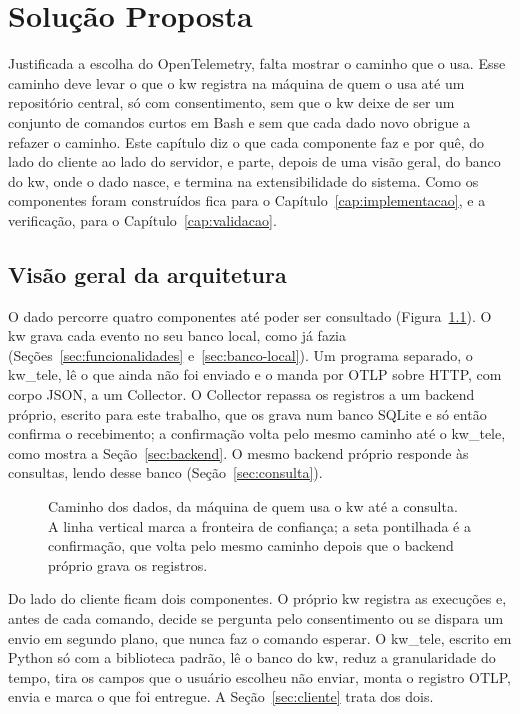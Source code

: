 
\chapter{Solução Proposta}

\label{cap:solucao}

Justificada a escolha do OpenTelemetry, falta mostrar o caminho que o usa. Esse caminho deve
levar o que o kw
registra na máquina de quem o usa até um repositório central, só com
consentimento, sem que o kw deixe de ser um conjunto de comandos curtos em
Bash e sem que cada dado novo obrigue a refazer o caminho. Este capítulo diz o
que cada componente faz e por quê, do lado do cliente ao lado do servidor, e
parte, depois de uma visão geral, do banco do kw, onde o dado nasce, e termina
na extensibilidade do sistema. Como os componentes foram construídos fica para o Capítulo~\ref{cap:implementacao}, e a
verificação, para o Capítulo~\ref{cap:validacao}.

\section{Visão geral da arquitetura}
\label{sec:arquitetura}

O dado percorre quatro componentes até poder ser consultado
(Figura~\ref{fig:arquitetura-caminho}). O kw grava cada evento no seu banco
local, como já fazia (Seções~\ref{sec:funcionalidades}
e~\ref{sec:banco-local}). Um programa separado, o kw\_tele, lê o que ainda não
foi enviado e o manda por OTLP sobre HTTP, com corpo JSON, a um Collector. O
Collector repassa os registros a um backend próprio, escrito para este
trabalho, que os grava num banco SQLite e só então confirma o recebimento; a
confirmação volta pelo mesmo caminho até o kw\_tele, como mostra a
Seção~\ref{sec:backend}. O mesmo backend próprio responde às consultas, lendo desse
banco (Seção~\ref{sec:consulta}).

\begin{figure}[!ht]
  \centering
  \resizebox{\textwidth}{!}{}
  \caption{Caminho dos dados, da máquina de quem usa o kw até a consulta. A
    linha vertical marca a fronteira de confiança; a seta pontilhada é a
    confirmação, que volta pelo mesmo caminho depois que o backend próprio
    grava os registros.}
  \label{fig:arquitetura-caminho}
\end{figure}

Do lado do cliente ficam dois componentes. O próprio kw registra as
execuções e, antes de cada comando, decide se pergunta pelo consentimento ou
se dispara um envio em segundo plano, que nunca faz o comando esperar. O
kw\_tele, escrito em Python só com a biblioteca padrão, lê o banco do kw,
reduz a granularidade do tempo, tira os campos que o usuário escolheu não
enviar, monta o registro OTLP, envia e marca o que foi entregue. A
Seção~\ref{sec:cliente} trata dos dois.

